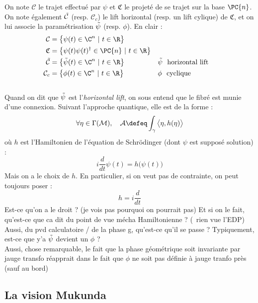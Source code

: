 On note $\mathcal{C}$ le trajet effectué par $\psi$ et $\mathfrak{C}$ le projeté de se trajet sur la base $\PC{n}$. On note également $\Tilde{\mathcal{C}}$ (resp. $\mathcal{C}_c$) le lift horizontal (resp. un lift cylique) de $\mathfrak{C}$, et on lui associe la paramétrisation $\Tilde{\psi}$ (resp. $\phi$). En clair :
\begin{align*}
	\mathcal{C} &= \big\{ \psi(t)\in\C^n\ |\  t\in\R \big\} \\
	\mathfrak{C} &= \big\{ \psi(t) \psi(t)^\dagger \in\PC{n}\ |\  t\in\R \big\} \\
	\Tilde{\mathcal{C}} &= \big\{ \Tilde{\psi}(t)\in\C^n\ |\  t\in\R \big\}  &  &\Tilde{\psi}\ \text{ horizontal lift}\\
	\mathcal{C}_c &= \big\{ \phi(t)\in\C^n\ |\  t\in\R \big\}  &  &\phi\ \text{ cyclique}
\end{align*}
\\

Quand on dit que $\Tilde{\psi}$ est l'\textit{horizontal lift}, on sous entend que le fibré est munie d'une connexion. Suivant l'approche quantique, elle est de la forme :
\[\forall \eta\in\Gamma(\mathcal{M}),\quad  \mathcal{A} \defeq \int_\gamma \big\langle \eta, h(\eta) \big\rangle\]
où $h$ est l'Hamiltonien de l'équation de Schrödinger (dont $\psi$ est supposé solution) :
\begin{equation}\label{eq:schrodinger}
	i\frac{d}{dt} \psi(t) = h\big(\psi(t)\big)
\end{equation}
Mais on a le choix de $h$. En particulier, si on veut pas de contrainte, on peut toujours poser :
\[h = i\frac{d}{dt}\]
Est-ce qu'on a le droit ? (je vois pas pourquoi on pourrait pas) Et si on le fait, qu'est-ce que ca dit du point de vue mécha Hamiltonienne ? (\apriori~rien vue l'EDP)
\\
Aussi, du pvd calculatoire / de la phase g, qu'est-ce qu'il se passe ? Typiquement, est-ce que y'a $\Tilde{\psi}$ devient un $\phi$ ?
\\

Aussi, chose remarquable, le fait que la phase géométrique soit invariante par jauge transfo réapprait dans le fait que $\phi$ ne soit pas définie à jauge tranfo près (sauf au bord)



\subsection{La vision Mukunda \cite{mukunda_quantum_1993,mukunda_quantum_1993-1}}

